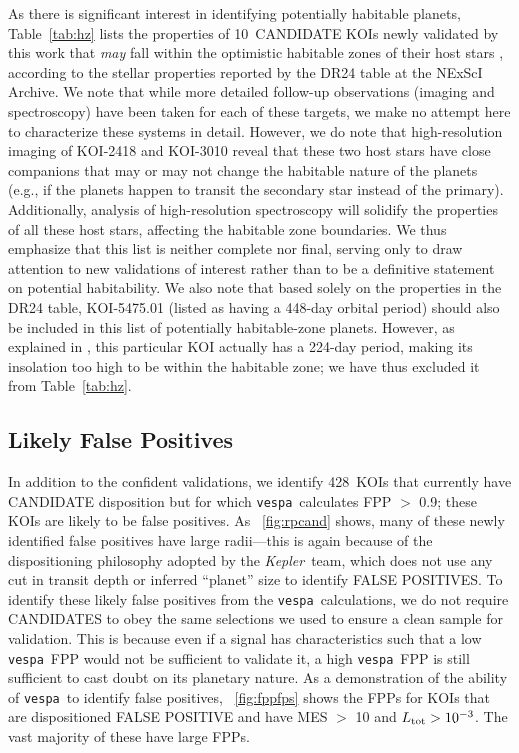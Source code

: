 \documentclass{emulateapj}
\newcommand{\figref}[1]{\ref{fig:#1}}
\newcommand{\Fig}[1]{\figurename~\figref{#1}}
\newcommand{\Tab}[1]{Table~\ref{tab:#1}}
\newcommand{\tab}[1]{\Tab{#1}}
\newcommand{\nfpnew}{428}  %
\newcommand{\nhz}{10}
\newcommand{\kepler}{\textit{Kepler}}
\newcommand{\vespa}{\texttt{vespa}}
\begin{document}


As there is significant interest in identifying potentially habitable
planets, \tab{hz} lists the properties of \nhz\ CANDIDATE KOIs newly
validated by this work that \textit{may} fall within the optimistic
habitable zones of their host stars \citep{Kopparapu:2013}, 
according to the stellar
properties reported by the DR24 table at the NExScI Archive.  We note
that while more detailed follow-up observations (imaging and
spectroscopy) have been taken for each of these targets, we make no
attempt here to characterize these systems in detail.  However, 
we do note that high-resolution imaging of KOI-2418 and KOI-3010 reveal
that these two host stars have close companions that may or may not
change the habitable nature of the planets (e.g., if the planets happen
to transit the secondary star instead of the primary).  Additionally, analysis of
high-resolution spectroscopy will solidify the
properties of all these host stars, affecting the habitable zone
boundaries.  We thus emphasize that this list is neither complete nor
final, serving only to draw attention to new validations of 
interest rather than to be a definitive statement on potential 
habitability.  We also note that based solely on the properties in the 
DR24 table, KOI-5475.01 (listed as having a 448-day orbital period) 
should also be included in this list of potentially habitable-zone
planets.  However, as explained in \citet[][Section 5.5.4]{Coughlin:2015},
this particular KOI actually has a 224-day period, making its insolation
too high to be within the habitable zone; we have thus excluded it 
from \tab{hz}.


\subsection{Likely False Positives}

In addition to the confident validations, we identify \nfpnew\ KOIs
that currently have CANDIDATE disposition but for which \vespa\
calculates FPP $>$ 0.9; these KOIs are likely to be false positives.
As \Fig{rpcand} shows, many of these newly identified false positives
have large radii---this is again because of the dispositioning
philosophy adopted by the \kepler\ team, which does not use any cut in
transit depth or inferred ``planet'' size to identify FALSE POSITIVES.
To identify these likely false positives from the \vespa\
calculations, we do not require CANDIDATES to obey the same selections
we used to ensure a clean sample for validation.  This is because even
if a signal has characteristics such that a low \vespa\ FPP would not
be sufficient to validate it, a high \vespa\ FPP is still sufficient
to cast doubt on its planetary nature. As a demonstration of the
ability of \vespa\ to identify false positives, \Fig{fppfps} shows the
FPPs for KOIs that are dispositioned FALSE POSITIVE and have MES $>$
10 and $L_{\rm tot} > 10^{-3}$. The vast majority of these have large
FPPs.
\end{document}
